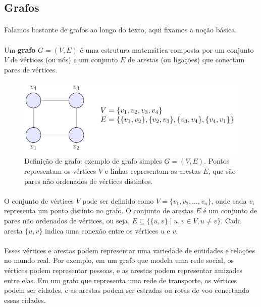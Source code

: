 \documentclass[12pt,a4paper]{article}
\def\emph#1{#1}%
\begin{document}
\subsection{Grafos}
\paragraph{}
Falamos bastante de grafos ao longo do texto, aqui fixamos a noção básica. 

\paragraph{}
Um \textbf{grafo} \(G = (V, E)\) é uma estrutura matemática composta por um conjunto \(V\) de \emph{vértices} (ou \emph{nós}) e um conjunto \(E\) de \emph{arestas} (ou \emph{ligações}) que conectam pares de vértices. 


\begin{figure}[H]
    \centering
    \includegraphics[width=0.9\linewidth]{figures/fig_def_grafo.pdf}

    \caption{Definição de grafo: exemplo de grafo simples \(G=(V,E)\). Pontos representam os vértices \(V\) e linhas representam as arestas \(E\), que são pares não ordenados de vértices distintos.}
    \label{fig:def-grafo}\end{figure}


\paragraph{}
O conjunto de vértices \(V\) pode ser definido como \(V = \{v_1, v_2, \ldots, v_n\}\), onde cada \(v_i\) representa um ponto distinto no grafo. O conjunto de arestas \(E\) é um conjunto de pares não ordenados de vértices, ou seja, \(E \subseteq \{\{u, v\} \mid u, v \in V, u \neq v\}\). Cada aresta \(\{u, v\}\) indica uma conexão entre os vértices \(u\) e \(v\).

\paragraph{}
Esses vértices e arestas podem representar uma variedade de entidades e relações no mundo real. Por exemplo, em um grafo que modela uma rede social, os vértices podem representar pessoas, e as arestas podem representar amizades entre elas. Em um grafo que representa uma rede de transporte, os vértices podem ser cidades, e as arestas podem ser estradas ou rotas de voo conectando essas cidades.
\end{document}
